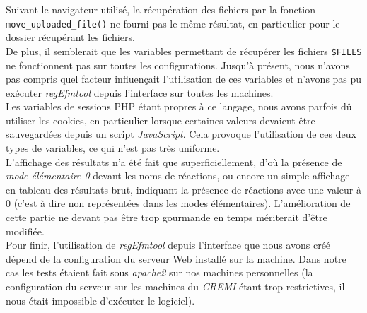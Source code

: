 Suivant le navigateur utilisé, la récupération des fichiers par la fonction \texttt{move\_uploaded\_file()} ne fourni pas le m\^eme résultat, en particulier pour le dossier récupérant les fichiers. \\
De plus, il semblerait que les variables permettant de récupérer les fichiers \texttt{\$FILES} ne fonctionnent pas sur toutes les configurations. Jusqu'à présent, nous n'avons pas compris quel facteur influençait l'utilisation de ces variables et n'avons pas pu exécuter \textit{regEfmtool} depuis l'interface sur toutes les machines. \\
Les variables de sessions PHP étant propres à ce langage, nous avons parfois dû utiliser les cookies, en particulier lorsque certaines valeurs devaient \^etre sauvegardées depuis un script \emph{JavaScript}. Cela provoque l'utilisation de ces deux types de variables, ce qui n'est pas très uniforme. \\
L'affichage des résultats n'a été fait que superficiellement, d'où la présence de \textit{mode élémentaire 0} devant les noms de réactions, ou encore un simple affichage en tableau des résultats brut, indiquant la présence de réactions avec une valeur à 0 (c'est à dire non représentées dans les modes élémentaires). L'amélioration de cette partie ne devant pas être trop gourmande en temps mériterait d'\^etre modifiée. \\
Pour finir, l'utilisation de \textit{regEfmtool} depuis l'interface que nous avons créé dépend de la configuration du serveur Web installé sur la machine. Dans notre cas les tests étaient fait sous \emph{apache2} sur nos machines personnelles (la configuration du serveur sur les machines du \emph{CREMI} étant trop restrictives, il nous était impossible d'exécuter le logiciel).



